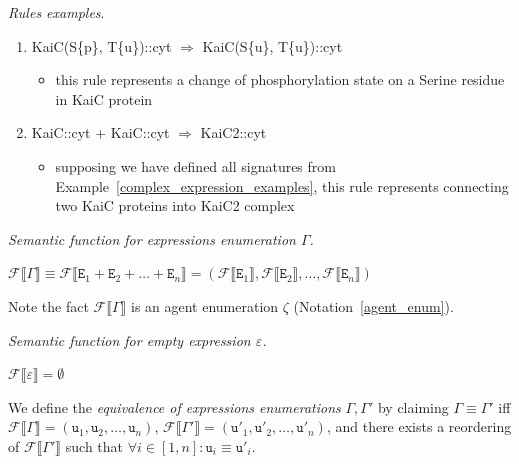 \documentclass{elsarticle}
\begin{document}
\begin{example}\label{rules_examples}
\textit{Rules examples}.

\begin{center}
\begin{enumerate}
	\item KaiC(S\{p\}, T\{u\})::cyt $\Rightarrow$ KaiC(S\{u\}, T\{u\})::cyt
	\begin{itemize}
		\item this rule represents a change of phosphorylation state on a Serine residue in KaiC protein
	\end{itemize}
	\item KaiC::cyt + KaiC::cyt $\Rightarrow$ KaiC2::cyt
	\begin{itemize}
		\item supposing we have defined all signatures from Example~\ref{complex_expression_examples}, this rule represents connecting two KaiC proteins into KaiC2 complex
	\end{itemize}
\end{enumerate}
\end{center}
\end{example}

\begin{definition}
\emph{Semantic function for expressions enumeration $\Gamma$.}

\begin{center}
$\mathcal{F} \llbracket \Gamma \rrbracket \equiv \mathcal{F} \llbracket \mathtt{E}_1 + \mathtt{E}_2 + \ldots + \mathtt{E}_n \rrbracket = ( \mathcal{F} \llbracket \mathtt{E}_1 \rrbracket,\mathcal{F} \llbracket \mathtt{E}_2 \rrbracket, \ldots, \mathcal{F} \llbracket \mathtt{E}_n \rrbracket)$
\end{center}
\end{definition}

Note the fact $\mathcal{F} \llbracket \Gamma \rrbracket$ is an agent enumeration $\zeta$ (Notation~\ref{agent_enum}).

\begin{definition}
\textit{Semantic function for empty expression $\varepsilon$.}

\begin{center}
$\mathcal{F} \llbracket \varepsilon \rrbracket = \emptyset$
\end{center}
\end{definition}

\begin{definition}\label{enumeration_equiv}
We define the \emph{equivalence of expressions enumerations} $\Gamma, \Gamma'$ by claiming $\Gamma \equiv \Gamma'$ iff $\mathcal{F} \llbracket \Gamma \rrbracket = (\mathtt{u}_1, \mathtt{u}_2, \ldots, \mathtt{u}_n)$, $\mathcal{F} \llbracket \Gamma' \rrbracket = (\mathtt{u}'_1, \mathtt{u}'_2, \ldots, \mathtt{u}'_n)$, and there exists a reordering of $\mathcal{F} \llbracket \Gamma' \rrbracket$ such that $\forall i \in [1, n]: \mathtt{u}_i \equiv \mathtt{u}'_i$.
\end{definition}
\end{document}
